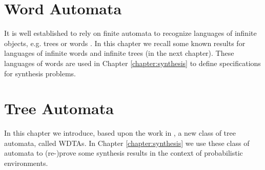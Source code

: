 \chapter{Word Automata}
It is well established to rely on finite automata to recognize languages of 
infinite objects, e.g. trees or words \cite{LangAutoLog}. In this chapter we
recall some known results for languages of infinite words and infinite trees 
(in the next chapter). These languages of words are used in Chapter 
\ref{chapter:synthesis} to define specifications for synthesis problems.





\chapter{Tree Automata}
In this chapter we introduce, based upon the work in \cite{RandAutoInfTrees}, 
a new class of tree automata, called \aclp{WDTA}. In Chapter 
\ref{chapter:synthesis} we use these class of automata to (re-)prove some 
synthesis results in the context of probabilistic environments.




